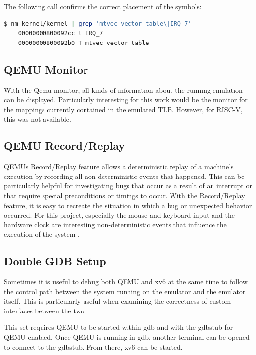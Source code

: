 The following call confirms the correct placement of the symbols:

\begin{lstlisting}[language={sh},basicstyle=\footnotesize]
    $ nm kernel/kernel | grep 'mtvec_vector_table\|IRQ_7'
    00000000800092cc t IRQ_7
    00000000800092b0 T mtvec_vector_table
\end{lstlisting}


\subsection{QEMU Monitor}
With the Qemu monitor, all kinds of information about the running emulation can be displayed. Particularly interesting for this work would be the monitor for the mappings currently contained in the emulated TLB. However, for RISC-V, this was not available.



\subsection{QEMU Record/Replay}
QEMUs Record/Replay feature allows a deterministic replay of a machine's execution by recording
all non-deterministic events that happened. This can be particularly helpful for investigating bugs
that occur as a result of an interrupt or that require special preconditions or timings to occur.
With the Record/Replay feature, it is easy to recreate the situation in which a bug or unexpected
behavior occurred.
For this project, especially the mouse and keyboard input and the hardware clock are interesting
non-deterministic events that influence the execution of the system \cite{RecordReplayQEMU}.

\subsection{Double GDB Setup}

Sometimes it is useful to debug both QEMU and xv6 at the same time to follow the control path between the system running on the emulator and the emulator itself. This is particularly useful when examining the correctness of custom interfaces between the two.

This set requires QEMU to be started within gdb and with the gdbstub for QEMU enabled. Once QEMU is running in gdb, another terminal can be opened to connect to the gdbstub. From there, xv6 can be started.

